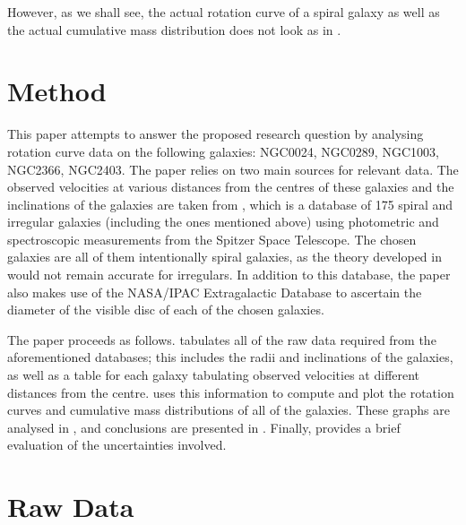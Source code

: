 \documentclass{article}
\begin{document}
However, as we shall see, the actual rotation curve of a spiral galaxy as well as the actual cumulative mass distribution does not look as in .


\section{Method}\label{sec:method}

This paper attempts to answer the proposed research question by analysing rotation curve data on the following galaxies: NGC0024, NGC0289, NGC1003, NGC2366, NGC2403.
The paper relies on two main sources for relevant data.
The observed velocities at various distances from the centres of these galaxies and the inclinations of the galaxies are taken from \Cite{SPARC}, which is a database of 175 spiral and irregular galaxies (including the ones mentioned above) using photometric and spectroscopic measurements from the Spitzer Space Telescope.
The chosen galaxies are all of them intentionally spiral galaxies, as the theory developed in  would not remain accurate for irregulars.
In addition to this database, the paper also makes use of the NASA/IPAC Extragalactic Database to ascertain the diameter of the visible disc of each of the chosen galaxies.

The paper proceeds as follows.
 tabulates all of the raw data required from the aforementioned databases; this includes the radii and inclinations of the galaxies, as well as a table for each galaxy tabulating observed velocities at different distances from the centre.
 uses this information to compute and plot the rotation curves and cumulative mass distributions of all of the galaxies.
These graphs are analysed in , and conclusions are presented in .
Finally,  provides a brief evaluation of the uncertainties involved.

\section{Raw Data}\label{sec:raw-data}
\end{document}
